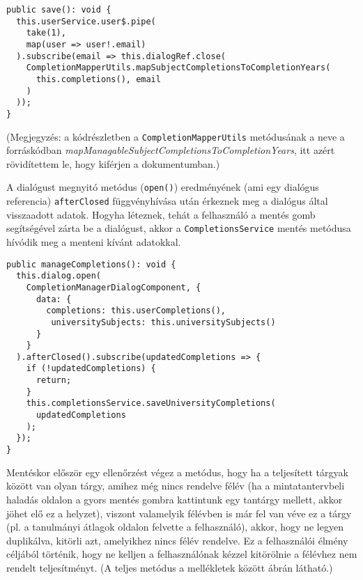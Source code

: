 \documentclass[a4paper,12pt]{report}
\begin{document}
\begin{samepage}
    \begin{verbatim}
public save(): void {
  this.userService.user$.pipe(
    take(1),
    map(user => user!.email)
  ).subscribe(email => this.dialogRef.close(
    CompletionMapperUtils.mapSubjectCompletionsToCompletionYears(
      this.completions(), email
    )
  ));
}
    \end{verbatim}
\end{samepage}

(Megjegyzés: a kódrészletben a \verb|CompletionMapperUtils| metódusának a neve a forráskódban \textit{mapManagableSubjectCompletionsToCompletionYears}, itt azért rövidítettem le, hogy kiférjen a dokumentumban.)

A dialógust megnyitó metódus (\verb|open()|) eredményének (ami egy dialógus referencia) \verb|afterClosed| függvényhívása után érkeznek meg a dialógus által visszaadott adatok. Hogyha léteznek, tehát a felhasználó a mentés gomb segítségével zárta be a dialógust, akkor a \verb|CompletionsService| mentés metódusa hívódik meg a menteni kívánt adatokkal.

\pagebreak
\begin{samepage}
    \begin{verbatim}
public manageCompletions(): void {
  this.dialog.open(
    CompletionManagerDialogComponent, {
      data: {
        completions: this.userCompletions(),
         universitySubjects: this.universitySubjects()
      }
    }
  ).afterClosed().subscribe(updatedCompletions => {
    if (!updatedCompletions) {
      return;
    }
    this.completionsService.saveUniversityCompletions(
      updatedCompletions
    );
  });
}
    \end{verbatim}
\end{samepage}

Mentéskor először egy ellenőrzést végez a metódus, hogy ha a teljesített tárgyak között van olyan tárgy, amihez még nincs rendelve félév (ha a mintatantervbeli haladás oldalon a gyors mentés gombra kattintunk egy tantárgy mellett, akkor jöhet elő ez a helyzet), viszont valamelyik félévben is már fel van véve ez a tárgy (pl. a tanulmányi átlagok oldalon felvette a felhasználó), akkor, hogy ne legyen duplikálva, kitörli azt, amelyikhez nincs félév rendelve. Ez a felhasználói élmény céljából történik, hogy ne kelljen a felhasználónak kézzel kitörölnie a félévhez nem rendelt teljesítményt. (A teljes metódus a mellékletek között  ábrán látható.)
\end{document}
